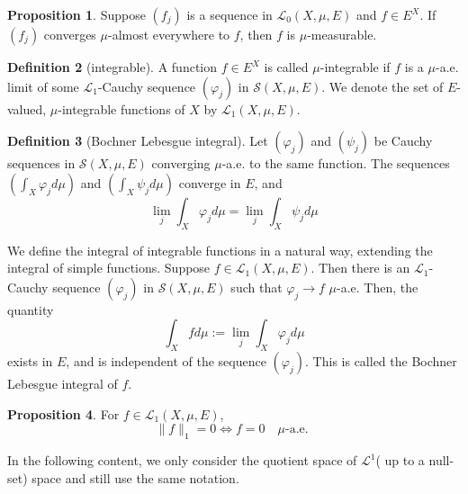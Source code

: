 \documentclass[12pt,a4paper]{book}
\theoremstyle{definition}
\newtheorem{defn}{Definition}[section]
\newtheorem{prop}[defn]{Proposition}
\begin{document}
\begin{prop}
    Suppose $\left(f_j\right)$ is a sequence in $\mathcal{L}_0(X, \mu, E)$ and $f \in E^X$. If $\left(f_j\right)$ converges $\mu$-almost everywhere to $f$, then $f$ is $\mu$-measurable.
\end{prop}










\begin{defn}[integrable]
    A function $f \in E^X$ is called $\mu$-integrable if $f$ is a $\mu$-a.e. limit of some $\mathcal{L}_{1}$-Cauchy sequence $\left(\varphi_j\right)$ in $\mathcal{S}(X, \mu, E)$. We denote the set of $E$-valued, $\mu$-integrable functions of $X$ by $\mathcal{L}_1(X, \mu, E)$.
\end{defn}
\begin{defn}[Bochner Lebesgue integral]
    Let $\left(\varphi_j\right)$ and $\left(\psi_j\right)$ be Cauchy sequences in $\mathcal{S}(X, \mu, E)$ converging $\mu$-a.e. to the same function. The sequences $\left(\int_X \varphi_j d \mu\right)$ and $\left(\int_X \psi_j d \mu\right)$ converge in $E$, and
    $$
    \lim _j \int_X \varphi_j d \mu=\lim _j \int_X \psi_j d \mu
    $$
    
    We define the integral of integrable functions in a natural way, extending the integral of simple functions. Suppose $f \in \mathcal{L}_1(X, \mu, E)$. Then there is an $\mathcal{L}_1$-Cauchy sequence $\left(\varphi_j\right)$ in $\mathcal{S}(X, \mu, E)$ such that $\varphi_j \rightarrow f$ $\mu$-a.e. Then, the quantity
    $$
    \int_X f d \mu:=\lim _j \int_X \varphi_j d \mu
    $$
    exists in $E$, and is independent of the sequence $\left(\varphi_j\right)$. 
    This is called the Bochner Lebesgue integral of $f$.
\end{defn}
\begin{prop}
    For $f \in \mathcal{L}_1(X, \mu, E)$,
    $$
    \|f\|_1=0 \Leftrightarrow f=0 \quad \mu \text {-a.e. }
    $$

\end{prop}
In the following content, 
we only consider the quotient space of $\mathcal{L}^1$( up to a null-set) space and still use the same notation. 
\end{document}
